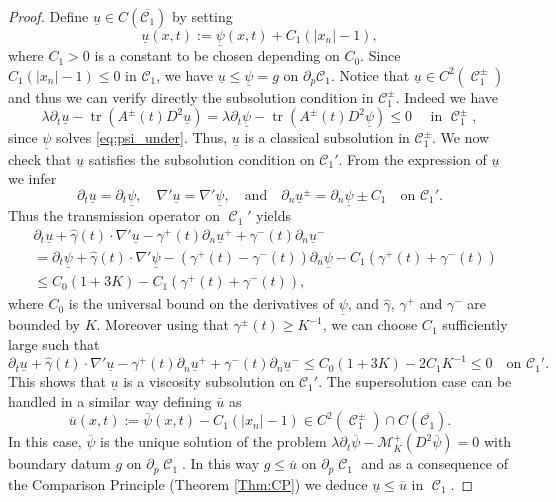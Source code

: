 \documentclass[12pt]{article}
\numberwithin{Theorem}{section}
\theoremstyle{definition}
\theoremstyle{remark}
\numberwithin{equation}{section}
\DeclareMathOperator{\C}{\mathcal{C}}
\newcommand{\p}{\partial}
\begin{document}
\begin{proof}
Define $\underline{u} \in C(\overline{\mathcal{C}_1})$ by setting
\[
\underline{u}(x,t) := \underline{\psi}(x,t) + C_1 (|x_n| - 1),
\]
where $C_1> 0$ is a constant to be chosen depending on $C_0$.
Since $C_1(|x_n|-1) \le 0$ in $\mathcal{C}_1$, we have $\underline{u} \le \underline{\psi} = g$ on $\partial_p \mathcal{C}_1$.
Notice that $\underline{u} \in C^2(\C_1^\pm)$ and thus we can verify directly the subsolution condition in $\mathcal{C}_1^\pm$. Indeed we have
\[
\lambda \partial_t \underline{u} - \operatorname{tr}(A^\pm(t) D^2 \underline{u}) = \lambda \partial_t \underline{\psi} - \operatorname{tr}(A^\pm(t) D^2 \underline{\psi})\leq 0  \quad \text{ in }\C_1^\pm, 
\] 
since $\underline{\psi}$ solves \eqref{eq:psi_under}.
 Thus, $\underline{u}$ is a classical subsolution in $\mathcal{C}_1^\pm$.
We now check that $\underline{u}$ satisfies the subsolution condition on $\mathcal{C}_1'$. From the expression of $\underline{u}$ we infer 
\[
\partial_t \underline{u} = \partial_t \underline{\psi}, \quad \nabla' \underline{u} = \nabla' \underline{\psi}, \quad \text{and} \quad \partial_n \underline{u}^\pm = \partial_n \underline{\psi} \pm C_1 \quad \text{on } \mathcal{C}_1'.
\]
Thus the transmission operator on $\C_1'$ yields
\begin{align*}
    &\partial_t \underline{u} + \hat{\gamma}(t) \cdot \nabla' \underline{u} - \gamma^+(t) \partial_n \underline{u}^+ + \gamma^-(t) \partial_n \underline{u}^- \\
&= \partial_t \underline{\psi} + \hat{\gamma}(t) \cdot \nabla' \underline{\psi} - (\gamma^+(t) - \gamma^-(t))\partial_n \underline{\psi} - C_1(\gamma^+(t) + \gamma^-(t))
\\ &\leq C_0(1 + 3K) - C_1(\gamma^+(t) + \gamma^-(t)),
\end{align*}
where $C_0$ is the universal bound on the derivatives of $\underline{\psi}$, and $\hat \gamma$, $\gamma^+$ and $\gamma^-$ are bounded by $K$.
Moreover using that
  $\gamma^\pm(t) \ge K^{-1}$, we can choose $C_1$ sufficiently large such that
\[
\partial_t \underline{u} + \hat{\gamma}(t) \cdot \nabla' \underline{u} - \gamma^+(t) \partial_n \underline{u}^+ + \gamma^-(t) \partial_n \underline{u}^-\le C_0(1 + 3K) - 2C_1K^{-1} \le 0 \quad \text{on } \mathcal{C}_1'.
\]
 This shows that $\underline{u}$ is a viscosity subsolution on $\mathcal{C}_1'$.
The supersolution case can be handled in a similar way defining $\overline{u}$ as
$$
\overline{u}(x,t) := \overline{\psi}(x,t) - C_1 (|x_n| - 1)  \in C^2(\C_1^\pm) \cap C(\overline{\mathcal{C}_1}).
$$ 
In this case, $\overline{\psi}$ is the unique solution of the problem $\lambda \partial_t \overline{\psi} - \mathcal{M}_K^+(D^2 \overline{\psi}) = 0$ with boundary datum
$g$ on $\p_p \C_1$. In this way $ g \leq \overline{u} $ on $\p_p \C_1$ and as a consequence of the Comparison Principle (Theorem \ref{Thm:CP}) we deduce $\underline{u}\leq \overline{u}$ in $\C_1$.

\end{proof}
\end{document}

